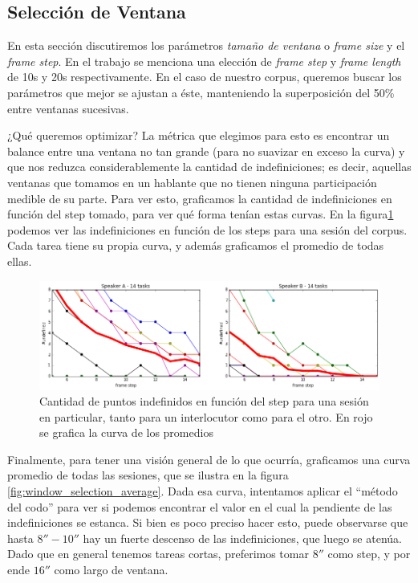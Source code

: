\subsection{Selección de Ventana}
\label{sec:window_selection}

En esta sección discutiremos los parámetros \emph{tamaño de ventana} o \emph{frame size} y el \emph{frame step}. En el trabajo \cite{KOU2008.2} se menciona una elección de \emph{frame step} y \emph{frame length} de 10s y 20s respectivamente. En el caso de nuestro corpus, queremos buscar los parámetros que mejor se ajustan a éste, manteniendo la superposición del 50\% entre ventanas sucesivas.

¿Qué queremos optimizar? La métrica que elegimos para esto es encontrar un balance entre una ventana no tan grande (para no suavizar en exceso la curva) y que nos reduzca considerablemente la cantidad de indefiniciones; es decir, aquellas ventanas que tomamos en un hablante que no tienen ninguna participación medible de su parte. Para ver esto, graficamos la cantidad de indefiniciones en función del step tomado, para ver qué forma tenían estas curvas. En la figura\ref{fig:window_selection_session} podemos ver las indefiniciones en función de los steps para una sesión del corpus. Cada tarea tiene su propia curva, y además graficamos el promedio de todas ellas.

\begin{figure}
\centering
\includegraphics[width=15cm]{images/window_selection_for_session.png}
\caption{Cantidad de puntos indefinidos en función del step para una sesión en particular, tanto para un interlocutor como para el otro. En rojo se grafica la curva de los promedios}
\label{fig:window_selection_session}
\end{figure}

Finalmente, para tener una visión general de lo que ocurría, graficamos una curva promedio de todas las sesiones, que se ilustra en la figura \ref{fig:window_selection_average}. Dada esa curva, intentamos aplicar el ``método del codo'' para ver si podemos encontrar el valor en el cual la pendiente de las indefiniciones se estanca. Si bien es poco preciso hacer esto, puede observarse que hasta $8''-10''$ hay un fuerte descenso de las indefiniciones, que luego se atenúa. Dado que en general tenemos tareas cortas, preferimos tomar $8''$ como step, y por ende $16''$ como largo de ventana.

